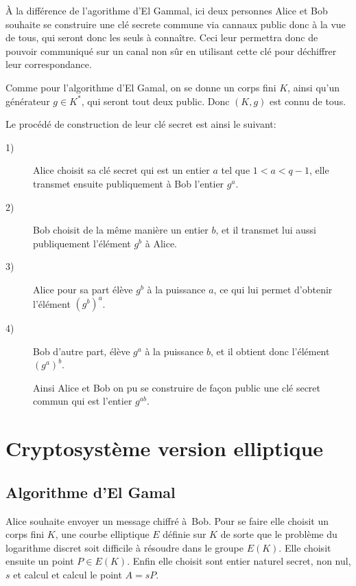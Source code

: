 À la différence de l'agorithme d'El Gammal, ici deux personnes Alice et Bob souhaite se construire une clé secrete commune via cannaux public donc à la vue de tous, qui seront donc les seuls à connaître. Ceci leur permettra donc de pouvoir communiqué sur un canal non sûr en utilisant cette clé pour déchiffrer leur correspondance.

Comme pour l'algorithme d'El Gamal, on se donne un corps fini $K$, ainsi qu'un générateur $g \in K^{*}$, qui seront tout deux public. Donc $(K,g)$ est connu de tous.

Le procédé de construction de leur clé secret est ainsi le suivant:

\begin{description}
    \item[1)] Alice choisit sa clé secret qui est un entier $a$ tel que $1<a<q-1$, elle transmet ensuite publiquement à Bob l'entier $g^{a}$.

    \item[2)] Bob choisit de la même manière un entier $b$, et il transmet lui aussi publiquement l'élément $g^{b}$ à Alice.

    \item[3)] Alice pour sa part élève $g^{b}$ à la puissance $a$, ce qui lui permet d'obtenir l'élément $(g^{b})^{a}$.

    \item[4)] Bob d'autre part, élève $g^{a}$ à la puissance $b$, et il obtient donc l'élément $(g^{a})^{b}$.

        Ainsi Alice et Bob on pu se construire de façon public une clé secret commun qui est l'entier $g^{ab}$.
\end{description}

\section{Cryptosystème version elliptique}

\subsection{Algorithme d'El Gamal}

Alice souhaite envoyer un message chiffré à Bob. Pour se faire elle choisit un corps fini $K$, une courbe elliptique $E$ définie sur $K$ de sorte que le problème du logarithme discret soit difficile à résoudre dans le groupe $E(K)$. Elle choisit ensuite un point $P \in E(K)$. Enfin elle choisit sont entier naturel secret, non nul, $s$ et calcul et calcul le point $A=sP$.

